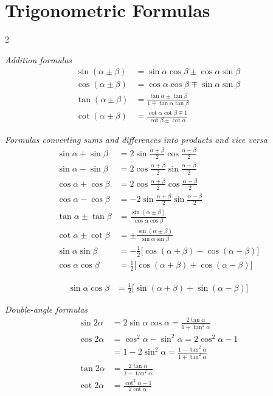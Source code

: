 \section*{Trigonometric Formulas}

\begin{multicols}{2}
\footnotesize
\raggedcolumns
\setlength{\parindent}{0pt}

\textit{Addition formulas}
\begin{align*}
\sin(\alpha\pm\beta) &= \sin\alpha\cos\beta\pm\cos\alpha\sin\beta\\
\cos(\alpha\pm\beta) &= \cos\alpha\cos\beta\mp\sin\alpha\sin\beta\\
\tan(\alpha\pm\beta) &= \frac{\tan\alpha\pm\tan\beta}{1\mp\tan\alpha\tan\beta}\\
\cot(\alpha\pm\beta) &= \frac{\cot\alpha\cot\beta\mp1}{\cot\beta\pm\cot\alpha}
\end{align*}

\textit{Formulas converting sums and differences into products and vice versa}
\begin{align*}
\sin\alpha+\sin\beta &= 2\sin\frac{\alpha+\beta}{2}\cos\frac{\alpha-\beta}{2}\\
\sin\alpha-\sin\beta &= 2\cos\frac{\alpha+\beta}{2}\sin\frac{\alpha-\beta}{2}\\
\cos\alpha+\cos\beta &= 2\cos\frac{\alpha+\beta}{2}\cos\frac{\alpha-\beta}{2}\\
\cos\alpha-\cos\beta &= -2\sin\frac{\alpha+\beta}{2}\sin\frac{\alpha-\beta}{2}\\
\tan\alpha\pm\tan\beta &= \frac{\sin(\alpha\pm\beta)}{\cos\alpha\cos\beta}\\
\cot\alpha\pm\cot\beta &= \pm\frac{\sin(\alpha\pm\beta)}{\sin\alpha\sin\beta}\\
\sin\alpha\sin\beta &= -\frac12\bigl[\cos(\alpha+\beta)-\cos(\alpha-\beta)\bigr]\\
\cos\alpha\cos\beta &= \frac12\bigl[\cos(\alpha+\beta)+\cos(\alpha-\beta)\bigr]
\end{align*}

\columnbreak

\begin{align*}
\sin\alpha\cos\beta &= \frac12\bigl[\sin(\alpha+\beta)+\sin(\alpha-\beta)\bigr]
\end{align*}

\textit{Double-angle formulas}
\begin{align*}
\sin2\alpha &= 2\sin\alpha\cos\alpha=\frac{2\tan\alpha}{1+\tan^2\alpha}\\
\cos2\alpha &= \cos^2\alpha-\sin^2\alpha=2\cos^2\alpha-1\\
&= 1-2\sin^2\alpha=\frac{1-\tan^2\alpha}{1+\tan^2\alpha}\\
\tan2\alpha &= \frac{2\tan\alpha}{1-\tan^2\alpha}\\
\cot2\alpha &= \frac{\cot^2\alpha-1}{2\cot\alpha}
\end{align*}


\end{multicols}
